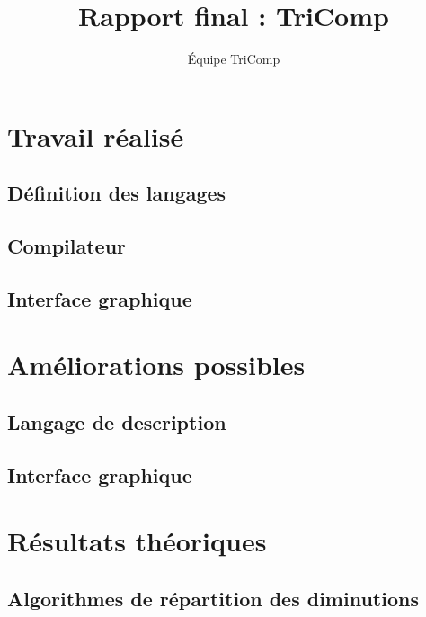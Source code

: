 \documentclass{article}
\title{Rapport final : TriComp}
\author{Équipe TriComp}
\date{}
\begin{document}
\maketitle

\newpage

\tableofcontents

\section{Travail réalisé}

\subsection{Définition des langages}

\subsection{Compilateur}

\subsection{Interface graphique}





\section{Améliorations possibles}


\subsection{Langage de description}

\subsection{Interface graphique}



\section{Résultats théoriques}

\subsection{Algorithmes de répartition des diminutions}
\end{document}
